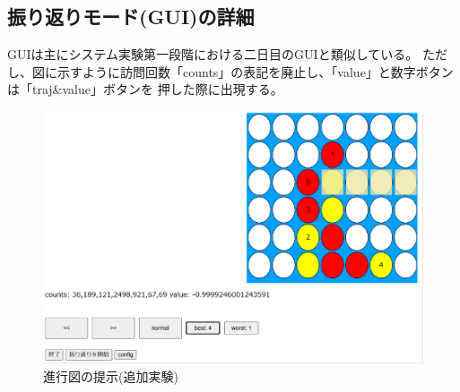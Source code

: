 \subsection{振り返りモード(GUI)の詳細}
GUIは主にシステム実験第一段階における二日目のGUIと類似している。
ただし、図\label{fig:extra}に示すように訪問回数「counts」の表記を廃止し、「value」と数字ボタンは「traj\&value」ボタンを
押した際に出現する。
\begin{figure}[t]
	\centering
    \includegraphics[width=\linewidth]{./figure/trajSystem.pdf}
	\caption{進行図の提示(追加実験)}
	\label{fig:extra}
\end{figure}

